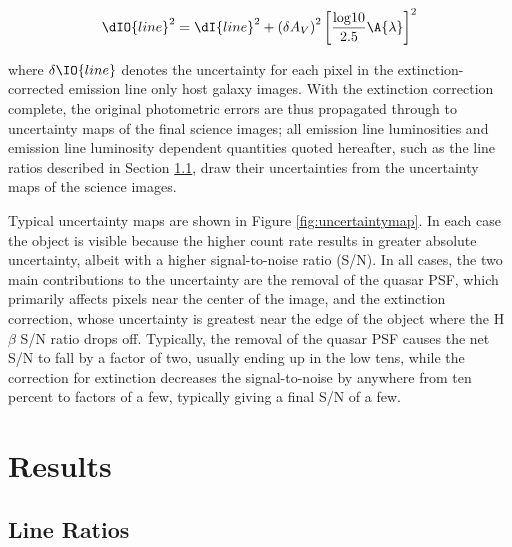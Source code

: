 \begin{equation}
\dIO{line}^2 = \dI{line}^2 + {\left(\delta A_V\right)}^2\left[\frac{{\rm log}10}{2.5}\A{\lambda}\right]^2
\end{equation}

where $\delta\IO{line}$ denotes the uncertainty for each pixel in the extinction-corrected emission line only host galaxy images. With the extinction correction complete, the original photometric errors are thus propagated through to uncertainty maps of the final science images; all emission line luminosities and emission line luminosity dependent quantities quoted hereafter, such as the line ratios described in Section \ref{sec:lineratios}, draw their uncertainties from the uncertainty maps of the science images.

Typical uncertainty maps are shown in Figure \ref{fig:uncertaintymap}. In each case the object is visible because the higher count rate results in greater absolute uncertainty, albeit with a higher signal-to-noise ratio (S/N).  In all cases, the two main contributions to the uncertainty are the removal of the quasar PSF, which primarily affects pixels near the center of the image, and the extinction correction, whose uncertainty is greatest near the edge of the object where the H$\beta$ S/N ratio drops off.  Typically, the removal of the quasar PSF causes the net S/N to fall by a factor of two, usually ending up in the low tens, while the correction for extinction decreases the signal-to-noise by anywhere from ten percent to factors of a few, typically giving a final S/N of a few.


\section{Results}
\label{sec:results}

\subsection{Line Ratios}
\label{sec:lineratios}



